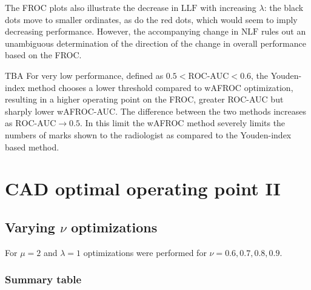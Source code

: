 \documentclass[
]{book}
\begin{document}
The FROC plots also illustrate the decrease in \(\text{LLF}\) with increasing \(\lambda\): the black dots move to smaller ordinates, as do the red dots, which would seem to imply decreasing performance. However, the accompanying change in \(\text{NLF}\) rules out an unambiguous determination of the direction of the change in overall performance based on the FROC.

TBA For very low performance, defined as \(0.5 < \text{ROC-AUC} < 0.6\), the Youden-index method chooses a lower threshold compared to wAFROC optimization, resulting in a higher operating point on the FROC, greater ROC-AUC but sharply lower wAFROC-AUC. The difference between the two methods increases as \(\text{ROC-AUC} \rightarrow 0.5\). In this limit the wAFROC method severely limits the numbers of marks shown to the radiologist as compared to the Youden-index based method.

\hypertarget{cad-optim-op-point-2}{%
\chapter{CAD optimal operating point II}\label{cad-optim-op-point-2}}

\hypertarget{optim-op-point-vary-nu}{%
\section{\texorpdfstring{Varying \(\nu\) optimizations}{Varying \textbackslash nu optimizations}}\label{optim-op-point-vary-nu}}

For \(\mu = 2\) and \(\lambda = 1\) optimizations were performed for \(\nu = 0.6, 0.7, 0.8, 0.9\).

\hypertarget{summary-table-2}{%
\subsection{Summary table}\label{summary-table-2}}
\end{document}
